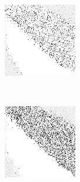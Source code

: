 \begin{figure}
\begin{subfigure}[t]{0.22\textwidth}
		\caption{\handmaxavg}
	\end{subfigure}
	~
	\begin{subfigure}[t]{0.22\textwidth}
		\includegraphics[width=\textwidth]{images/findings/round1/strategies_handmaxmed.png}
		\caption{\handmaxmed}
	\end{subfigure}
	~
	\begin{subfigure}[t]{0.22\textwidth}
		\includegraphics[width=\textwidth]{images/findings/round1/strategies_handmaxposs.png}
		\caption{\handmaxposs}
	\end{subfigure}


\end{figure}
